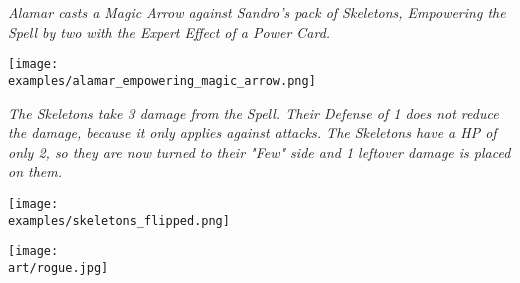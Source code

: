 \begin{multicols}{2}

\textit{Alamar casts a Magic Arrow against Sandro's pack of Skeletons, Empowering  the Spell by two with the Expert  Effect  of a Power Card.}

\texttt{[image: \\examples/alamar\_empowering\_magic\_arrow.png]}
\par
\textit{
  The Skeletons take 3 damage  from the Spell.
  Their Defense  of 1 does not reduce the damage, because it only applies against attacks.
  The Skeletons have a HP  of only 2, so they are now turned to their "Few" side and 1 leftover damage  is placed on them.
}
\par
\texttt{[image: \\examples/skeletons\_flipped.png]}

\texttt{[image: \\art/rogue.jpg]}

\end{multicols}

